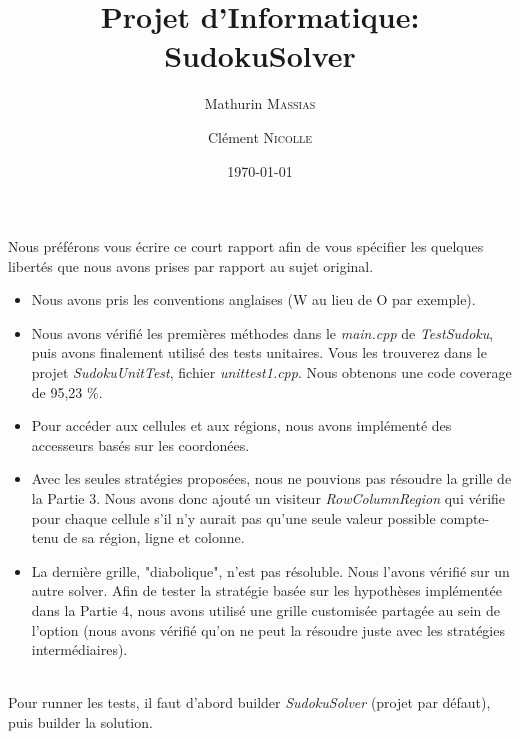\documentclass[11pt,a4paper]{article}
\title{Projet d'Informatique: SudokuSolver}
\author{Mathurin \textsc{Massias} \and Clément \textsc{Nicolle}}
\date{\today}
\begin{document}
	
\maketitle

Nous préférons vous écrire ce court rapport afin de vous spécifier les quelques libertés que nous avons prises par rapport au sujet original.
\\
\begin{itemize}
	\item Nous avons pris les conventions anglaises (W au lieu de O par exemple).
	\\
	\item Nous avons vérifié les premières méthodes dans le \textit{main.cpp} de \textit{TestSudoku}, puis avons finalement utilisé des tests unitaires. Vous les trouverez dans le projet \textit{SudokuUnitTest}, fichier \textit{unittest1.cpp}. Nous obtenons une code coverage de 95,23 \%.
	\\
	\item Pour accéder aux cellules et aux régions, nous avons implémenté des accesseurs basés sur les coordonées.
	\\
	\item Avec les seules stratégies proposées, nous ne pouvions pas résoudre la grille de la Partie 3. Nous avons donc ajouté un visiteur \textit{RowColumnRegion} qui vérifie pour chaque cellule s'il n'y aurait pas qu'une seule valeur possible compte-tenu de sa région, ligne et colonne.
	\\
	\item La dernière grille, "diabolique", n'est pas résoluble. Nous l'avons vérifié sur un autre solver. Afin de tester la stratégie basée sur les hypothèses implémentée dans la Partie 4, nous avons utilisé une grille customisée partagée au sein de l'option (nous avons vérifié qu'on ne peut la résoudre juste avec les stratégies intermédiaires).
\end{itemize}
%
\hspace{3mm}
\\
Pour runner les tests, il faut d'abord builder \textit{SudokuSolver} (projet par défaut), puis builder la solution.
\end{document}
